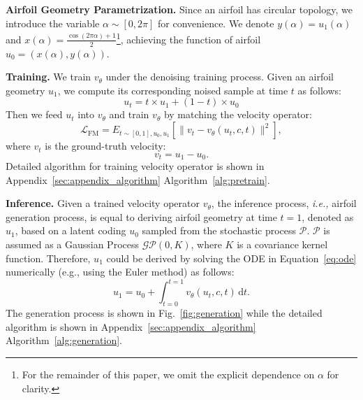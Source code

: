 \noindent \textbf{Airfoil Geometry Parametrization.} 
Since an airfoil has circular topology, we introduce the variable $\alpha \sim [0,2\pi]$ for convenience. 
We denote $y(\alpha) = u_1(\alpha)$ and $x(\alpha) = \frac{\cos(2\pi \alpha) + 1}{2}$\footnote{For the remainder of this paper, we omit the explicit dependence on $\alpha$ for clarity.}, achieving the function of airfoil $u_0=(x(\alpha), y(\alpha))$.


\noindent \textbf{Training.} 
We train $v_{\theta}$ under the denoising training process. Given an airfoil geometry $u_1$, we compute its corresponding noised sample at time $t$  as follows:
\begin{equation}\label{eq:path}
    u_t = t\times u_1 + (1-t)\times u_0
\end{equation}
Then we feed $u_t$ into $v_\theta$ and train $v_{\theta}$ by matching the velocity operator:
\begin{equation}\label{eq:flow_matching}
    \mathcal{L}_{\mathrm{FM}}=E_{t\sim[0,1],u_0,u_1}\left[\|v_t-v_{\theta}(u_t,c,t)\|^2\right],
\end{equation}
where $v_t$ is the ground-truth velocity: \begin{equation}\label{eq:target_velocity}
    v_t = u_1 - u_0.
\end{equation}
Detailed algorithm for training velocity operator is shown in Appendix~\ref{sec:appendix_algorithm} Algorithm~\ref{alg:pretrain}.


\noindent \textbf{Inference.}  Given a trained velocity operator $v_{\theta}$, the inference process, \emph{i.e.,} airfoil generation process, is equal to deriving airfoil geometry at time $t=1$, denoted as $u_1$, based on a latent coding $u_0$ sampled from the stochastic process $\mathcal{P}$. $\mathcal{P}$ is assumed as a Gaussian Process $\mathcal{GP}(0, K)$, where $K$ is a covariance kernel function. Therefore, $u_1$ could be derived by solving the ODE in Equation~\ref{eq:ode} numerically (e.g., using the Euler method) as follows:
\begin{equation}
    u_1 = u_0 + \int_{t=0}^{t=1} v_{\theta}(u_t, c, t)\,\mathrm{d}t.
\end{equation}
The generation process is shown in Fig.~\ref{fig:generation} while the detailed algorithm is shown in Appendix~\ref{sec:appendix_algorithm} Algorithm~\ref{alg:generation}.

\iffalse
\begin{figure*}[t]
    \small
    \centering
    \texttt{[image: assets/pretrain\_2.pdf]}
    \caption{Training the velocity operator $v_{\theta}$ via Operator Flow Matching in \textbf{FuncGenFoil}.}
    \label{fig:pretrain}
\end{figure*}
\fi

